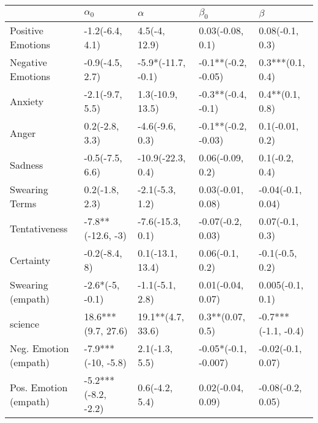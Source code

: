 \begin{tabular}{lllll}
\toprule
{} &           $\alpha_0$ &            $\alpha$ &             $\beta_0$ &              $\beta$ \\
\midrule
Positive Emotions     &      -1.2(-6.4, 4.1) &       4.5(-4, 12.9) &      0.03(-0.08, 0.1) &      0.08(-0.1, 0.3) \\
Negative Emotions     &      -0.9(-4.5, 2.7) &  -5.9*(-11.7, -0.1) &   -0.1**(-0.2, -0.05) &     0.3***(0.1, 0.4) \\
Anxiety               &      -2.1(-9.7, 5.5) &    1.3(-10.9, 13.5) &    -0.3**(-0.4, -0.1) &      0.4**(0.1, 0.8) \\
Anger                 &       0.2(-2.8, 3.3) &     -4.6(-9.6, 0.3) &   -0.1**(-0.2, -0.03) &      0.1(-0.01, 0.2) \\
Sadness               &      -0.5(-7.5, 6.6) &   -10.9(-22.3, 0.4) &      0.06(-0.09, 0.2) &       0.1(-0.2, 0.4) \\
Swearing Terms        &       0.2(-1.8, 2.3) &     -2.1(-5.3, 1.2) &     0.03(-0.01, 0.08) &    -0.04(-0.1, 0.04) \\
Tentativeness         &    -7.8**(-12.6, -3) &    -7.6(-15.3, 0.1) &     -0.07(-0.2, 0.03) &      0.07(-0.1, 0.3) \\
Certainty             &        -0.2(-8.4, 8) &    0.1(-13.1, 13.4) &       0.06(-0.1, 0.2) &      -0.1(-0.5, 0.2) \\
Swearing (empath)     &      -2.6*(-5, -0.1) &     -1.1(-5.1, 2.8) &     0.01(-0.04, 0.07) &     0.005(-0.1, 0.1) \\
science               &   18.6***(9.7, 27.6) &   19.1**(4.7, 33.6) &      0.3**(0.07, 0.5) &  -0.7***(-1.1, -0.4) \\
Neg. Emotion (empath) &   -7.9***(-10, -5.8) &      2.1(-1.3, 5.5) &  -0.05*(-0.1, -0.007) &    -0.02(-0.1, 0.07) \\
Pos. Emotion (empath) &  -5.2***(-8.2, -2.2) &      0.6(-4.2, 5.4) &     0.02(-0.04, 0.09) &    -0.08(-0.2, 0.05) \\
\bottomrule
\end{tabular}
